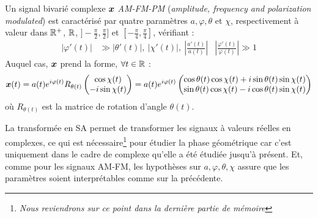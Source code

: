 \begin{definition}[Signal AM-FM-PM] \label{def:AM-FM-PM}
	Un signal bivarié complexe $\boldsymbol{x}$ \emph{AM-FM-PM} (\emph{amplitude, frequency and polarization modulated}) est caractérisé par quatre paramètres $a,\varphi,\theta$ et $\chi$, respectivement à valeur dans $\mathbb{R}^+$, $\mathbb{R}$, $]-\frac{\pi}{2}, \frac{\pi}{2}]$ et $[-\frac{\pi}{4}, \frac{\pi}{4}]$, vérifiant :
	\begin{align}\label{eq:condi_AM-FM-PM}
		\big| \varphi'(t) \big| &\gg \big| \theta'(t) \big| ,\ \big| \chi'(t) \big| ,\ \left| \frac{a'(t)}{a(t)}\right|  &  \left| \frac{\varphi'(t)}{\varphi(t)}\right| \gg 1
	\end{align}
	Auquel cas, $\boldsymbol{x}$ prend la forme, $\forall t\in\mathbb{R}$ :
	\begin{equation}\label{eq:AM-FM-PM}
		\boldsymbol{x}(t) = a(t)e^{i\varphi(t)} R_{\theta(t)} \begin{pmatrix} \cos\chi(t) \\ -i\sin\chi(t) \end{pmatrix} 
		= a(t)e^{i\varphi(t)} \begin{pmatrix} \cos\theta(t) \cos\chi(t) + i\sin\theta(t) \sin\chi(t) \\ \sin\theta(t) \cos\chi(t) - i\cos\theta(t) \sin\chi(t) \end{pmatrix}
	\end{equation}
	où $R_{\theta(t)}$ est la matrice de rotation d'angle $\theta(t)$.
	\\
\end{definition}
\skipl

La transformée en SA permet de transformer les signaux à valeurs réelles en complexes, ce qui est nécessaire\footnote{\itshape
	Nous reviendrons sur ce point dans la dernière partie de mémoire }
pour étudier la phase géométrique car c'est uniquement dans le cadre de complexe qu'elle a été étudiée jusqu'à présent. Et, comme pour les signaux AM-FM, les hypothèses sur $a,\varphi,\theta,\chi$ assure que les paramètres soient interprétables comme sur la  précédente.
\\

